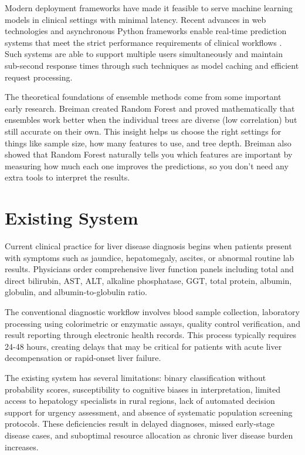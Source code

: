 \documentclass[conference]{IEEEtran}
\begin{document}
Modern deployment frameworks have made it feasible to serve machine learning models in clinical settings with minimal latency. Recent advances in web technologies and asynchronous Python frameworks enable real-time prediction systems that meet the strict performance requirements of clinical workflows \cite{rajkomar2018}. Such systems are able to support multiple users simultaneously and maintain sub-second response times through such techniques as model caching and efficient request processing.

The theoretical foundations of ensemble methods come from some important early research. Breiman \cite{breiman2001} created Random Forest and proved mathematically that ensembles work better when the individual trees are diverse (low correlation) but still accurate on their own. This insight helps us choose the right settings for things like sample size, how many features to use, and tree depth. Breiman also showed that Random Forest naturally tells you which features are important by measuring how much each one improves the predictions, so you don't need any extra tools to interpret the results.

\section{Existing System}

Current clinical practice for liver disease diagnosis begins when patients present with symptoms such as jaundice, hepatomegaly, ascites, or abnormal routine lab results. Physicians order comprehensive liver function panels including total and direct bilirubin, AST, ALT, alkaline phosphatase, GGT, total protein, albumin, globulin, and albumin-to-globulin ratio.

The conventional diagnostic workflow involves blood sample collection, laboratory processing using colorimetric or enzymatic assays, quality control verification, and result reporting through electronic health records. This process typically requires 24-48 hours, creating delays that may be critical for patients with acute liver decompensation or rapid-onset liver failure.

The existing system has several limitations: binary classification without probability scores, susceptibility to cognitive biases in interpretation, limited access to hepatology specialists in rural regions, lack of automated decision support for urgency assessment, and absence of systematic population screening protocols. These deficiencies result in delayed diagnoses, missed early-stage disease cases, and suboptimal resource allocation as chronic liver disease burden increases.
\end{document}

